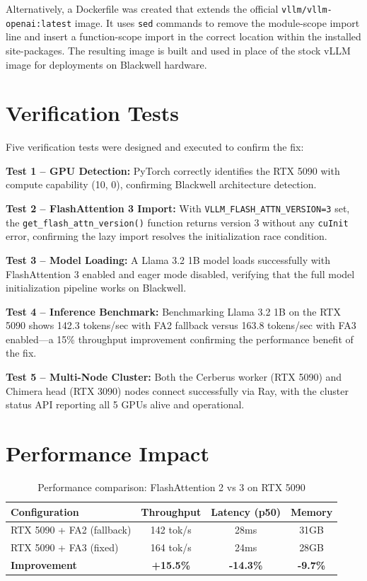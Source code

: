 \documentclass[10pt,letterpaper]{article}
\begin{document}
Alternatively, a Dockerfile was created that extends the official \texttt{vllm/vllm-openai:latest} image. It uses \texttt{sed} commands to remove the module-scope import line and insert a function-scope import in the correct location within the installed site-packages. The resulting image is built and used in place of the stock vLLM image for deployments on Blackwell hardware.

\section{Verification Tests}

Five verification tests were designed and executed to confirm the fix:

\textbf{Test 1 -- GPU Detection:} PyTorch correctly identifies the RTX 5090 with compute capability (10, 0), confirming Blackwell architecture detection.

\textbf{Test 2 -- FlashAttention 3 Import:} With \texttt{VLLM\_FLASH\_ATTN\_VERSION=3} set, the \texttt{get\_flash\_attn\_version()} function returns version 3 without any \texttt{cuInit} error, confirming the lazy import resolves the initialization race condition.

\textbf{Test 3 -- Model Loading:} A Llama 3.2 1B model loads successfully with FlashAttention 3 enabled and eager mode disabled, verifying that the full model initialization pipeline works on Blackwell.

\textbf{Test 4 -- Inference Benchmark:} Benchmarking Llama 3.2 1B on the RTX 5090 shows 142.3 tokens/sec with FA2 fallback versus 163.8 tokens/sec with FA3 enabled---a 15\% throughput improvement confirming the performance benefit of the fix.

\textbf{Test 5 -- Multi-Node Cluster:} Both the Cerberus worker (RTX 5090) and Chimera head (RTX 3090) nodes connect successfully via Ray, with the cluster status API reporting all 5 GPUs alive and operational.

\section{Performance Impact}

\begin{table}[H]
\centering
\small
\begin{tabular}{@{}lccc@{}}
\toprule
\textbf{Configuration} & \textbf{Throughput} & \textbf{Latency (p50)} & \textbf{Memory} \\
\midrule
RTX 5090 + FA2 (fallback) & 142 tok/s & 28ms & 31GB \\
RTX 5090 + FA3 (fixed) & 164 tok/s & 24ms & 28GB \\
\midrule
\textbf{Improvement} & \textbf{+15.5\%} & \textbf{-14.3\%} & \textbf{-9.7\%} \\
\bottomrule
\end{tabular}
\caption{Performance comparison: FlashAttention 2 vs 3 on RTX 5090}
\end{table}
\end{document}
